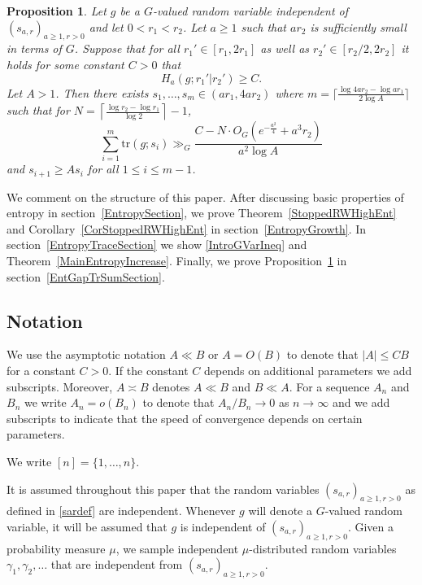 \documentclass[10pt, english,oneside,reqno]{amsart}
\theoremstyle{plain}
\newtheorem{proposition}[theorem]{Proposition}
\theoremstyle{remark}
\numberwithin{equation}{section}
\numberwithin{figure}{section}
\newcommand{\tr}{\mathrm{tr}}
\begin{document}
\begin{proposition} \label{EntropyGapToTrSum}
    Let $g$ be a $G$-valued random variable independent of $(s_{a,r})_{a \geq 1, r > 0}$ and let $0 < r_1 < r_2$. Let $a \geq 1$ such that $ar_2$ is sufficiently small in terms of $G$. Suppose that for all $r_1' \in [r_1, 2r_1]$ as well as $r_2' \in [r_2/2, 2r_2]$ it holds for some constant $C> 0$ that $$H_a(g; r_1'| r_2') \geq C.$$ Let $A > 1$. Then there exists $s_1, \dots, s_{m} \in (ar_1, 4ar_2)$ where $m = \lceil \frac{\log 4ar_2 - \log ar_1}{2\log A} \rceil$ such that for $N = \left\lceil \frac{\log r_2 - \log r_1}{\log 2} \right\rceil - 1$,
    \begin{equation*}
        \sum_{i=1}^m \tr (g ; s_i) \gg_G \frac{C - N\cdot O_G(e^{-\frac{a^2}{4}} + a^3r_2)}{a^2 \log A}
    \end{equation*}
    and $s_{i+1} \geq A s_i$ for all $1 \leq i \leq m-1$.
\end{proposition}

    We comment on the structure of this paper. After discussing basic properties of entropy in section~\ref{EntropySection}, we prove Theorem~\ref{StoppedRWHighEnt} and Corollary~\ref{CorStoppedRWHighEnt} in section~\ref{EntropyGrowth}. In section~\ref{EntropyTraceSection} we show \eqref{IntroGVarIneq} and Theorem~\ref{MainEntropyIncrease}. Finally, we prove Proposition~\ref{EntropyGapToTrSum} in section~\ref{EntGapTrSumSection}.

    \subsection*{Notation}

    We use the asymptotic notation $A \ll B$ or $A = O(B)$ to denote that $|A| \leq CB$ for a constant $C > 0$. If the constant $C$ depends on additional parameters we add subscripts. Moreover, $A \asymp B$ denotes $A \ll B$ and $B \ll A$. For a sequence $A_n$ and $B_n$ we write $A_n = o(B_n)$ to denote that $A_n/B_n \to 0$ as $n \to \infty$ and we add subscripts to indicate that the speed of convergence depends on certain parameters. 

    We write $[n] = \{ 1, \ldots , n \}$.

    It is assumed throughout this paper that the random variables $(s_{a,r})_{a \geq 1, r > 0}$ as defined in \eqref{sardef} are independent. Whenever $g$ will denote a $G$-valued random variable, it will be assumed that $g$ is independent of $(s_{a,r})_{a \geq 1, r > 0}$. Given a probability measure $\mu$, we sample independent $\mu$-distributed random variables $\gamma_1, \gamma_2, \ldots $ that are independent from $(s_{a,r})_{a \geq 1, r > 0}$.
\end{document}
